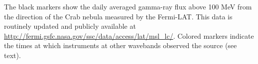 The black markers show the daily averaged gamma-ray flux above 100 MeV from the direction of the Crab nebula measured by the Fermi-LAT. This data is routinely updated and publicly available at \url{http://fermi.gsfc.nasa.gov/ssc/data/access/lat/msl_lc/}. Colored markers indicate the times at which instruments at other wavebands observed the source (see text).\label{fig:lc}